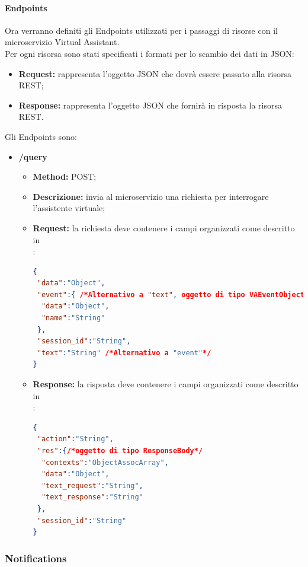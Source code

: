 \paragraph{Endpoints}

Ora verranno definiti gli Endpoints utilizzati per i passaggi di risorse con il microservizio Virtual Assistant.\\
Per ogni risorsa sono stati specificati i formati per lo scambio dei dati in JSON:
\begin{itemize}
\item \textbf{Request:} rappresenta l’oggetto JSON che dovrà essere passato alla risorsa REST;
\item \textbf{Response:} rappresenta l’oggetto JSON che fornirà in risposta la risorsa REST.
\end{itemize}
Gli Endpoints sono:
\begin{itemize}
\item \textbf{/query}\\
\begin{itemize}
\item \textbf{Method:} POST;
\item \textbf{Descrizione:} invia al microservizio una richiesta per interrogare l'assistente virtuale;
\item \textbf{Request:} la richiesta deve contenere i campi organizzati come descritto in \\:
\begin{lstlisting}[language=json,firstnumber=1]
{
 "data":"Object",
 "event":{ /*Alternativo a "text", oggetto di tipo VAEventObject*/
  "data":"Object",
  "name":"String"
 },
 "session_id":"String",
 "text":"String" /*Alternativo a "event"*/
}
\end{lstlisting}
\item \textbf{Response:} la risposta deve contenere i campi organizzati come descritto in \\:
\begin{lstlisting}[language=json,firstnumber=1]
{
 "action":"String",
 "res":{/*oggetto di tipo ResponseBody*/
  "contexts":"ObjectAssocArray",
  "data":"Object",
  "text_request":"String",
  "text_response":"String"
 },
 "session_id":"String"
}
\end{lstlisting}
\end{itemize}
\end{itemize}


\subsubsection{Notifications}
